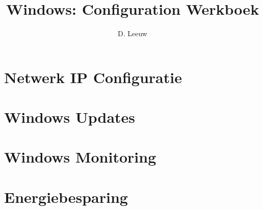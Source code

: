 \documentclass[a4paper,12pt,twoside,titlepage]{article}
\author{D. Leeuw}
\title{Windows: Configuration Werkboek}
\date{\today\\
0.0.0
\vfill
\raggedright
\copyright\ 2025 Dennis Leeuw\\
}
\begin{document}

\maketitle



\section{Netwerk IP Configuratie}


\section{Windows Updates}


\section{Windows Monitoring}


\section{Energiebesparing}


\printindex
\end{document}
